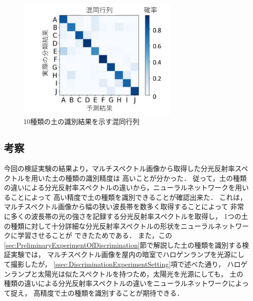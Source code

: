 \begin{figure}[b]
	\begin{center}
	\centering
	\includegraphics[width=8cm]{./Ch3_SoilTypeDiscrimination/Fig/confusion_matrix_compressed.pdf}
	\caption{10種類の土の識別結果を示す混同行列}\label{fig:discrimination_confusion_matrix}
	\end{center}
\end{figure}

\clearpage

\subsection{考察}
\label{ssec:DiscriminationConsideration}

今回の検証実験の結果より，マルチスペクトル画像から取得した分光反射率スペクトルを用いた土の種類の識別精度は
高いことが分かった．
従って，土の種類の違いによる分光反射率スペクトルの違いから，ニューラルネットワークを用いることによって
高い精度で土の種類を識別できることが確認出来た．
これは，マルチスペクトル画像から幅の狭い波長帯を数多く取得することによって
非常に多くの波長帯の光の強さを記録する分光反射率スペクトルを取得し，
1つの土の種類に対して十分詳細な分光反射率スペクトルの形状をニューラルネットワークに学習させることが
できたためである．
また，この\ref{sec:PreliminaryExperimentOfDiscrimination}節で解説した土の種類を識別する検証実験では，
マルチスペクトル画像を屋内の暗室でハロゲンランプを光源にして撮影したが，
\ref{ssec:DiscriminationExperimentSetting}項で述べた通り，
ハロゲンランプと太陽光は似たスペクトルを持つため，太陽光を光源にしても，
土の種類の違いによる分光反射率スペクトルの違いをニューラルネットワークによって捉え，
高精度で土の種類を識別することが期待できる．



